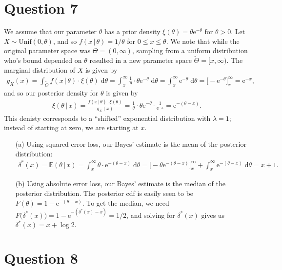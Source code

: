 \documentclass[10pt]{article}
\begin{document}
\section{Question 7} \noindent
We assume that our parameter \(\theta\) has a prior density \(\xi(\theta) = \theta \mathrm{e}^{-\theta}\) for \(\theta > 0\). 
Let \(X \sim \mathrm{Unif}(0, \theta)\), and so \(f(x \,|\, \theta) = 1 / \theta\) for \(0 \le x \le \theta\). We note that while the original parameter space
was \(\Theta = (0, \infty)\), sampling from a uniform distribution who's bound depended on \(\theta\) resulted in a new parameter space 
\(\tilde{\Theta} = [x, \infty)\). 
The marginal distribution of \(X\) is given by 
\begin{align*}
    g_{X}(x) 
    = \int_{\tilde{\Theta}} f(x \,|\, \theta) \cdot \xi(\theta) \;\mathrm{d}\theta
    = \int_x^{\infty} \frac{1}{\theta} \cdot \theta \mathrm{e}^{- \theta} \;\mathrm{d}\theta
    = \int_x^{\infty} \mathrm{e}^{- \theta} \;\mathrm{d}\theta
    = \Big[ -\mathrm{e}^{-\theta} \Big]_x^{\infty}
    = \mathrm{e}^{-x},
\end{align*}
and so our posterior density for \(\theta\) is given by 
\begin{align*}
    \xi(\theta \,|\, x) 
    = \frac{f(x \,|\, \theta) \cdot \xi(\theta)}{g_X(x)}
    = \frac{1}{\theta} \cdot \theta \mathrm{e}^{-\theta} \cdot \frac{1}{\mathrm{e}^{-x}}
    = \mathrm{e}^{-(\theta - x)}.
\end{align*}
This denisty corresponds to a ``shifted'' exponential distribution with \(\lambda = 1\); instead of starting at zero, we are starting at \(x\).
\begin{itemize}
    \item[(a)] Using squared error loss, our Bayes' estimate is the mean of the posterior distribution:
    \begin{align*}
        \delta^*(x)
        = \mathbb{E}(\theta \,|\, x)
        = \int_x^{\infty} \theta \cdot \mathrm{e}^{-(\theta - x)} \;\mathrm{d}\theta
        = \Big[ -\theta \mathrm{e}^{-(\theta - x)} \Big]_x^{\infty} + \int_x^{\infty} \mathrm{e}^{-(\theta - x)} \;\mathrm{d}\theta
        = x + 1.
    \end{align*}
    \item[(b)] Using absolute error loss, our Bayes' estimate is the median of the posterior distribution. 
    The posterior cdf is easily seen to be \(F(\theta) = 1 - \mathrm{e}^{-(\theta - x)}\).
    To get the median, we need 
    \(F \big( \delta^*(x) \big) = 1 - \mathrm{e}^{-(\delta^*(x) - x)} = 1/2\), and solving for \(\delta^*(x)\) gives us \(\delta^*(x) = x + \log 2\).
\end{itemize}

\section{Question 8} \noindent
\end{document}
